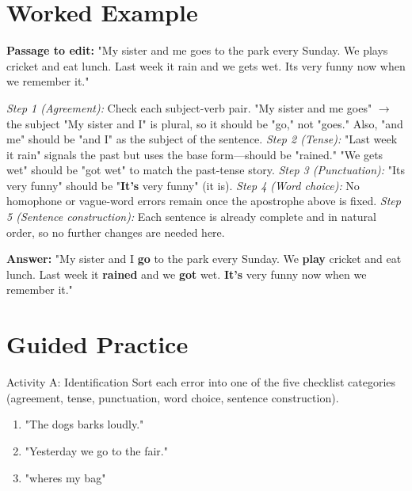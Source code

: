 \section{Worked Example}
\begin{examplebox}
\textbf{Passage to edit:} "My sister and me goes to the park every Sunday. We plays cricket and eat lunch. Last week it rain and we gets wet. Its very funny now when we remember it."

\textit{Step 1 (Agreement):} Check each subject-verb pair. "My sister and me goes" $\rightarrow$ the subject "My sister and I" is plural, so it should be "go," not "goes." Also, "and me" should be "and I" as the subject of the sentence.
\textit{Step 2 (Tense):} "Last week it rain" signals the past but uses the base form—should be "rained." "We gets wet" should be "got wet" to match the past-tense story.
\textit{Step 3 (Punctuation):} "Its very funny" should be "\textbf{It's} very funny" (it is).
\textit{Step 4 (Word choice):} No homophone or vague-word errors remain once the apostrophe above is fixed.
\textit{Step 5 (Sentence construction):} Each sentence is already complete and in natural order, so no further changes are needed here.

\textbf{Answer:} "My sister and I \textbf{go} to the park every Sunday. We \textbf{play} cricket and eat lunch. Last week it \textbf{rained} and we \textbf{got} wet. \textbf{It's} very funny now when we remember it."
\end{examplebox}

\section{Guided Practice}
\begin{activitybox}{Activity A: Identification}
Sort each error into one of the five checklist categories (agreement, tense, punctuation, word choice, sentence construction).
\begin{enumerate}
    \item "The dogs barks loudly."
    \item "Yesterday we go to the fair."
    \item "wheres my bag"
\end{enumerate}
\end{activitybox}

